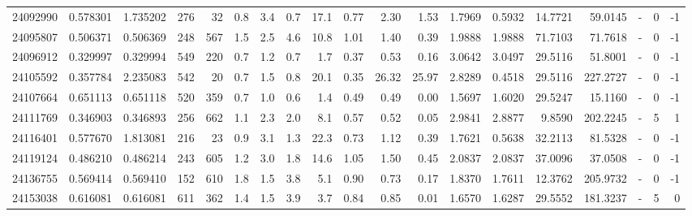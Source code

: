 \begin{tabular}{rrrrrrrrrrrrrrrrlrr}
  24092990 & 0.578301 &   1.735202 &  276 &   32 &      0.8 &      3.4 &     0.7 &     17.1 &       0.77 &        2.30 &        1.53 &  1.7969 &  0.5932 &   14.7721 &   59.0145 &             - &        0 &         -1 \\
  24095807 & 0.506371 &   0.506369 &  248 &  567 &      1.5 &      2.5 &     4.6 &     10.8 &       1.01 &        1.40 &        0.39 &  1.9888 &  1.9888 &   71.7103 &   71.7618 &             - &        0 &         -1 \\
  24096912 & 0.329997 &   0.329994 &  549 &  220 &      0.7 &      1.2 &     0.7 &      1.7 &       0.37 &        0.53 &        0.16 &  3.0642 &  3.0497 &   29.5116 &   51.8001 &             - &        0 &         -1 \\
  24105592 & 0.357784 &   2.235083 &  542 &   20 &      0.7 &      1.5 &     0.8 &     20.1 &       0.35 &       26.32 &       25.97 &  2.8289 &  0.4518 &   29.5116 &  227.2727 &             - &        0 &         -1 \\
  24107664 & 0.651113 &   0.651118 &  520 &  359 &      0.7 &      1.0 &     0.6 &      1.4 &       0.49 &        0.49 &        0.00 &  1.5697 &  1.6020 &   29.5247 &   15.1160 &             - &        0 &         -1 \\
  24111769 & 0.346903 &   0.346893 &  256 &  662 &      1.1 &      2.3 &     2.0 &      8.1 &       0.57 &        0.52 &        0.05 &  2.9841 &  2.8877 &    9.8590 &  202.2245 &             - &        5 &          1 \\
  24116401 & 0.577670 &   1.813081 &  216 &   23 &      0.9 &      3.1 &     1.3 &     22.3 &       0.73 &        1.12 &        0.39 &  1.7621 &  0.5638 &   32.2113 &   81.5328 &             - &        0 &         -1 \\
  24119124 & 0.486210 &   0.486214 &  243 &  605 &      1.2 &      3.0 &     1.8 &     14.6 &       1.05 &        1.50 &        0.45 &  2.0837 &  2.0837 &   37.0096 &   37.0508 &             - &        0 &         -1 \\
  24136755 & 0.569414 &   0.569410 &  152 &  610 &      1.8 &      1.5 &     3.8 &      5.1 &       0.90 &        0.73 &        0.17 &  1.8370 &  1.7611 &   12.3762 &  205.9732 &             - &        0 &         -1 \\
  24153038 & 0.616081 &   0.616081 &  611 &  362 &      1.4 &      1.5 &     3.9 &      3.7 &       0.84 &        0.85 &        0.01 &  1.6570 &  1.6287 &   29.5552 &  181.3237 &             - &        5 &          0 \\

\end{tabular}
